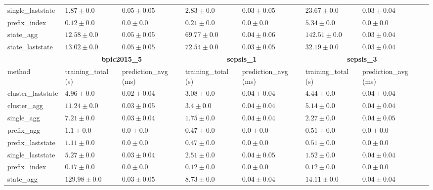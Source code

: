 \documentclass[twoside,11pt]{Latex/Classes/PhDthesisPSnPDF}
\begin{document}
\begin{table}[!htbp]
{\begin{tabular}{llllllll}
					single\_laststate & $1.87 \pm 0.0$ & $0.05 \pm 0.05$ & $2.83 \pm 0.0$ & $0.03 \pm 0.05$ & $23.67 \pm 0.0$ & $0.03 \pm 0.04$ \\ 
					prefix\_index & $\mathbf{0.12 \pm 0.0}$ & $\mathbf{0.0 \pm 0.0}$ & $\mathbf{0.21 \pm 0.0}$ & $\mathbf{0.0 \pm 0.0}$ & $\mathbf{5.34 \pm 0.0}$ & $\mathbf{0.0 \pm 0.0}$ \\ 
					state\_agg & $12.58 \pm 0.0$ & $0.05 \pm 0.05$ & $69.77 \pm 0.0$ & $0.04 \pm 0.06$ & $142.51 \pm 0.0$ & $0.03 \pm 0.04$ \\ 
					state\_laststate & $13.02 \pm 0.0$ & $0.05 \pm 0.05$ & $72.54 \pm 0.0$ & $0.03 \pm 0.05$ & $32.19 \pm 0.0$ & $0.03 \pm 0.04$ \\ 
					\bottomrule
					\toprule
					& \multicolumn{2}{c}{{\bfseries bpic2015\_5}} & \multicolumn{2}{c}{{\bfseries sepsis\_1}} & \multicolumn{2}{c}{{\bfseries sepsis\_3}} \\ \cmidrule(lr){2-3} \cmidrule(lr){4-5} \cmidrule(lr){6-7}
					method  & training\_total (s) & prediction\_avg (ms) & training\_total (s) & prediction\_avg (ms) & training\_total (s) & prediction\_avg (ms) \\ \midrule
					cluster\_laststate & $4.96 \pm 0.0$ & $0.02 \pm 0.04$ & $3.08 \pm 0.0$ & $0.04 \pm 0.04$ & $4.44 \pm 0.0$ & $0.04 \pm 0.04$ \\ 
					cluster\_agg & $11.24 \pm 0.0$ & $0.03 \pm 0.05$ & $3.4 \pm 0.0$ & $0.04 \pm 0.04$ & $5.14 \pm 0.0$ & $0.04 \pm 0.04$ \\ 
					single\_agg & $7.21 \pm 0.0$ & $0.03 \pm 0.04$ & $1.75 \pm 0.0$ & $0.04 \pm 0.04$ & $2.27 \pm 0.0$ & $0.04 \pm 0.05$ \\ 
					prefix\_agg & $1.1 \pm 0.0$ & $\mathbf{0.0 \pm 0.0}$ & $0.47 \pm 0.0$ & $\mathbf{0.0 \pm 0.0}$ & $0.51 \pm 0.0$ & $\mathbf{0.0 \pm 0.0}$ \\ 
					prefix\_laststate & $1.11 \pm 0.0$ & $\mathbf{0.0 \pm 0.0}$ & $0.47 \pm 0.0$ & $\mathbf{0.0 \pm 0.0}$ & $0.51 \pm 0.0$ & $\mathbf{0.0 \pm 0.0}$ \\ 
					single\_laststate & $5.27 \pm 0.0$ & $0.03 \pm 0.04$ & $2.51 \pm 0.0$ & $0.04 \pm 0.05$ & $1.52 \pm 0.0$ & $0.04 \pm 0.04$ \\ 
					prefix\_index & $\mathbf{0.17 \pm 0.0}$ & $\mathbf{0.0 \pm 0.0}$ & $\mathbf{0.12 \pm 0.0}$ & $\mathbf{0.0 \pm 0.0}$ & $\mathbf{0.12 \pm 0.0}$ & $\mathbf{0.0 \pm 0.0}$ \\ 
					state\_agg & $129.98 \pm 0.0$ & $0.03 \pm 0.05$ & $8.73 \pm 0.0$ & $0.04 \pm 0.04$ & $14.11 \pm 0.0$ & $0.04 \pm 0.04$ \\ 

\end{tabular}}
\end{table}
\end{document}
